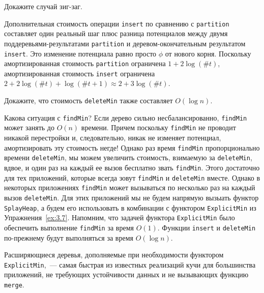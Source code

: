 \begin{theorem}
\begin{exercise}\label{ex:5.5}
  Докажите случай зиг-заг.
\end{exercise}

Дополнительная стоимость операции \lstinline!insert! по сравнению с
\lstinline!partition! составляет один реальный шаг плюс разница
потенциалов между двумя поддеревьями-результатами
\lstinline!partition! и деревом-окончательным результатом
\lstinline!insert!. Это изменение потенциала равно просто $\phi$ от
нового корня. Поскольку амортизированная стоимость
\lstinline!partition! ограничена $1 + 2\log(\#t)$, амортизированная
стоимость \lstinline!insert! ограничена
$2 + 2\log(\#t) + \log(\#t + 1) \approx 2 + 3\log(\#t)$.

\end{theorem}

\begin{exercise}\label{ex:5.6}
  Докажите, что стоимость \lstinline!deleteMin! также составляет
  $O(\log n)$.
\end{exercise}

Какова ситуация с \lstinline!findMin!? Если дерево сильно
несбалансированно, \lstinline!findMin! может занять до $O(n)$
времени. Причем поскольку \lstinline!findMin! не проводит никакой
перестройки и, следовательно, никак не изменяет потенциал,
амортизировать эту стоимость негде! Однако раз время
\lstinline!findMin! пропорционально времени \lstinline!deleteMin!,
мы можем увеличить стоимость, взимаемую за \lstinline!deleteMin!,
вдвое, и один раз на каждый ее вызов бесплатно звать
\lstinline!findMin!. Этого достаточно для тех приложений, которые
всегда зовут \lstinline!findMin! и \lstinline!deleteMin!
вместе. Однако в некоторых приложениях \lstinline!findMin! может
вызываться по несколько раз на каждый вызов \lstinline!deleteMin!. Для
этих приложений мы не будем напрямую вызыать функтор
\lstinline!SplayHeap!, а будем его использовать в комбинации с
функтором \lstinline!ExplicitMin! из
Упражнения~\ref{ex:3.7}. Напомним, что задачей функтора
\lstinline!ExplicitMin! было обеспечить выполнение \lstinline!findMin!
за время $O(1)$. Функции \lstinline!insert! и \lstinline!deleteMin!
по-прежнему будут выполняться за время $O(\log n)$.

\begin{hint}
  Расширяющиеся деревья, дополняемые при необходимости функтором
  \lstinline!ExplicitMin!,~--- самая быстрая из известных реализаций
  кучи для большинства приложений, не требующих устойчивости данных и
  не вызывающих функцию \lstinline!merge!.
\end{hint}

